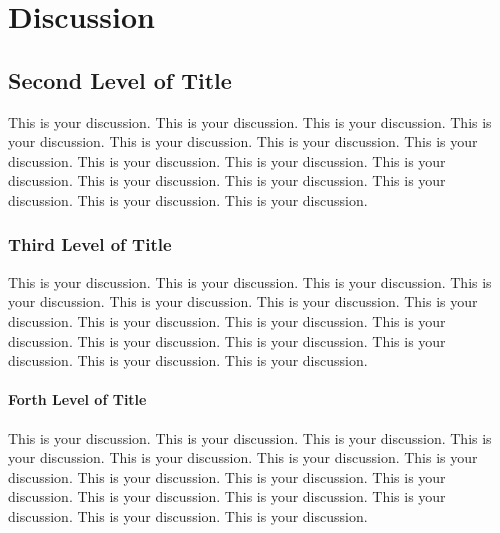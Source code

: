 \chapter{Discussion}
\label{c:discussion}
\section{Second Level of Title}
This is your discussion. This is your discussion. This is your discussion. This is your discussion. This is your discussion. This is your discussion. This is your discussion. This is your discussion. This is your discussion. This is your discussion. This is your discussion. This is your discussion. This is your discussion. This is your discussion. This is your discussion. 
\subsection{Third Level of Title}
This is your discussion. This is your discussion. This is your discussion. This is your discussion. This is your discussion. This is your discussion. This is your discussion. This is your discussion. This is your discussion. This is your discussion. This is your discussion. This is your discussion. This is your discussion. This is your discussion. This is your discussion. 
\subsubsection{Forth Level of Title}
This is your discussion. This is your discussion. This is your discussion. This is your discussion. This is your discussion. This is your discussion. This is your discussion. This is your discussion. This is your discussion. This is your discussion. This is your discussion. This is your discussion. This is your discussion. This is your discussion. This is your discussion. 